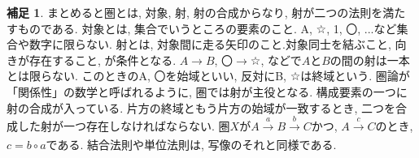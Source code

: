 \documentclass[a4paper]{jsarticle}
\theoremstyle{definition}
\newtheorem{hsk}[dfn]{補足}
\begin{document}
\begin{hsk}
まとめると圏とは, 対象, 射, 射の合成からなり, 射が二つの法則を満たすものである.
対象とは, 集合でいうところの要素のこと. A, ☆, 1, 〇, ...など集合や数字に限らない.
射とは, 対象間に走る矢印のこと.対象同士を結ぶこと, 向きが存在すること, が条件となる. $A \rightarrow B$, 〇$\rightarrow$☆, などで$A$と$B$の間の射は一本とは限らない. このときのA, 〇を始域といい, 反対にB, ☆は終域という. 圏論が「関係性」の数学と呼ばれるように, 圏では射が主役となる. 構成要素の一つに射の合成が入っている. 片方の終域ともう片方の始域が一致するとき, 二つを合成した射が一つ存在しなければならない. 圏$X$が$A\xrightarrow[]{a} B\xrightarrow[]{b} C$かつ, $A\xrightarrow[]{c} C$のとき, $c=b\circ a$である. 結合法則や単位法則は, 写像のそれと同様である. 
\\
\end{hsk}
\end{document}
